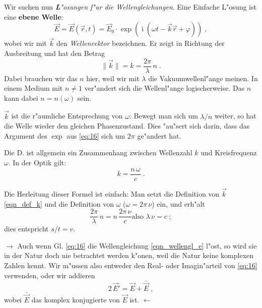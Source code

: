 \documentclass[twoside,a4paper]{book}
\newcommand{\st}[1]{{\slshape \textbf #1}}
\newcommand{\I}{\ensuremath{\operatorname{i}}}
\newenvironment*{Einschub}[0]{$\rightarrow$ \indent}{$\leftarrow$}
\begin{document}
Wir suchen nun \st{L"osungen f"ur die Wellengleichungen}. 
Eine Einfache L"osung ist eine \textbf{ebene Welle}:
\begin{equation}
   \label{eq:16}
   \vec E = \vec E(\vec r,t) = \vec E_0 \cdot \exp \left (\I (\omega t -
   \vec k \vec r + \varphi ) \right ) \;,
\end{equation}
wobei wir mit $\vec k$ den \emph{Wellenvektor}
bezeichnen. Er zeigt in Richtung der Ausbreitung und hat den Betrag
\begin{equation}
   \label{eqn_def_k}
   \|\vec k \| = k = \frac{2\pi}{\lambda} \, n \;.
\end{equation}
Dabei brauchen wir das $n$ hier, weil wir mit $\lambda$ die
Vakuumwellenl"ange meinen. In einem Medium
mit $n \neq 1$ ver"andert sich die Wellenl"ange logischerweise. Das
$n$ kann dabei $n = n(\omega)$ sein.

$\vec k$ ist die r"aumliche Entsprechung von $\omega$: Bewegt man sich
um $\lambda/n$ weiter, so hat die Welle wieder den gleichen
Phasenzustand. Dies "au"sert sich darin, dass das Argument des $\exp$
aus \eqref{eq:16} sich um $2\pi$ ge"andert hat.

\begin{Wichtig}
Die D. ist allgemein ein Zusammenhang zwischen Wellenzahl $k$ und
Kreisfrequenz $\omega$. In der Optik gilt:
\begin{equation}
   \label{eqn_dispersionslreation}
   \boxed{k = \frac{n \, \omega}{c} } \;.
\end{equation}
\end{Wichtig}
Die Herleitung dieser Formel ist einfach: Man setzt die Definition von
$\vec k$ \eqref{eqn_def_k} und die Definition von $\omega$ ($\omega =
2\pi\, \nu$) ein, und erh"alt
\begin{equation*}
   \frac{2\pi}{\lambda} \, n = n \, \frac{2\pi \, \nu}{c} \text{
     also }
\lambda \, \nu = c \;;
\end{equation*}
dies entspricht $s/t = v$.


\begin{Einschub}
   Auch wenn Gl. \eqref{eq:16} die Wellengleichung
   \eqref{eqn_wellengl_e} l"ost, so wird sie in der Natur doch nie
   betrachtet werden k"onen, weil die Natur keine komplexen Zahlen
   kennt. Wir m"ussen also entweder den Real- oder Imagin"arteil von
   \eqref{eq:16} verwenden, oder wir addieren
   \begin{equation*}
      2\, \vec E' = \vec E + \bar{\vec E}\;,
   \end{equation*}
   wobei $\bar{\vec E}$ das komplex konjugierte von $\vec E$ ist.
\end{Einschub}
\end{document}
